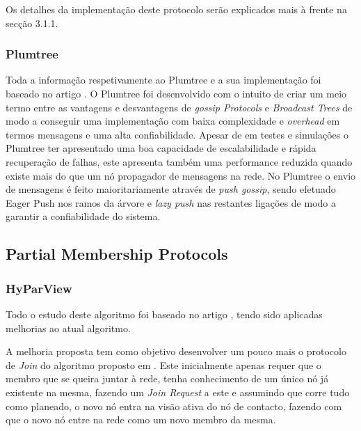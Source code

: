 Os detalhes da implementação deste protocolo serão explicados mais à frente na secção 3.1.1.


\subsubsection{Plumtree}

Toda a informação respetivamente ao Plumtree e a sua implementação foi baseado no artigo \cite{plumtree}.
O Plumtree foi desenvolvido com o intuito de criar um meio termo entre as vantagens e desvantagens de \textit{gossip Protocols} e \textit{Broadcast Trees} de modo a conseguir uma implementação com baixa complexidade e \textit{overhead} em termos mensagens e uma alta confiabilidade. Apesar de em testes e simulações o Plumtree ter apresentado uma boa capacidade de escalabilidade e rápida recuperação de falhas, este apresenta também uma performance reduzida quando existe mais do que um nó propagador de mensagens na rede.
No Plumtree o envio de mensagens é feito maioritariamente através de \textit{push gossip}, sendo efetuado Eager Push nos ramos da árvore e \textit{lazy push} nas restantes ligações de modo a garantir a confiabilidade do sistema.

\subsection{Partial Membership Protocols}

\subsubsection{HyParView}
Todo o estudo deste algoritmo foi baseado no artigo \cite{hyparview}, tendo sido aplicadas melhorias ao atual algoritmo. 

A melhoria proposta tem como objetivo desenvolver um pouco mais o protocolo de \textit{Join} do algoritmo proposto em \cite{hyparview}. Este inicialmente apenas requer que o membro que se queira juntar à rede, tenha conhecimento de um único nó já existente na mesma, fazendo um \textit{Join Request} a este e assumindo que corre tudo como planeado, o novo nó entra na visão ativa do nó de contacto, fazendo com que o novo nó entre na rede como um novo membro da mesma.

